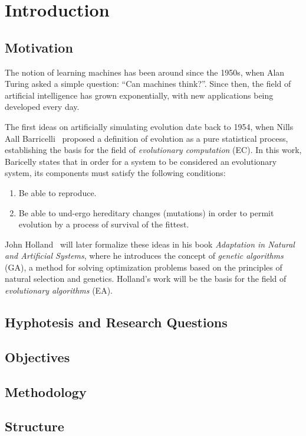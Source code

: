 \chapter{Introduction}
\label{chap:introduction}
  \section{Motivation}
  \label{sec:motivation}
    The notion of learning machines has been around since the 1950s, when Alan Turing 
    \autocite{turingCOMPUTINGMACHINERYINTELLIGENCE1950a} asked a simple question: 
    \enquote{Can machines think?}.
    Since then, the field of artificial intelligence has grown exponentially, with new
    applications being developed every day.
    
    The first ideas on artificially simulating evolution date back to 1954, when Nills Aall
    Barricelli~\autocite{barricelliNumericalTestingEvolution1962} proposed a definition of
    evolution as a pure statistical process, establishing the basis for the field of
    \emph{evolutionary computation} (EC).
    In this work, Baricelly states that in order for a system to be considered an evolutionary
    system, its components must satisfy the following conditions:

    \begin{enumerate}
      \item Be able to reproduce.
      \item Be able to und-ergo hereditary changes (mutations) in order to permit evolution by a 
        process of survival of the fittest.
    \end{enumerate}

    John Holland~\autocite{hollandAdaptationNaturalArtificial1992a} will later formalize these
    ideas in his book \emph{Adaptation in Natural and Artificial Systems}, where he introduces
    the concept of \emph{genetic algorithms} (GA), a method for solving optimization problems
    based on the principles of natural selection and genetics.
    Holland's work will be the basis for the field of \emph{evolutionary algorithms} (EA).

  \section{Hyphotesis and Research Questions}
  \label{sec:hyphotesis_and_research_questions}
    \Blindtext
  \section{Objectives}
  \label{sec:objectives}
    \Blindtext
  \section{Methodology}
  \label{sec:methodology}
    \Blindtext
  \section{Structure}
  \label{sec:structure}
    \Blindtext